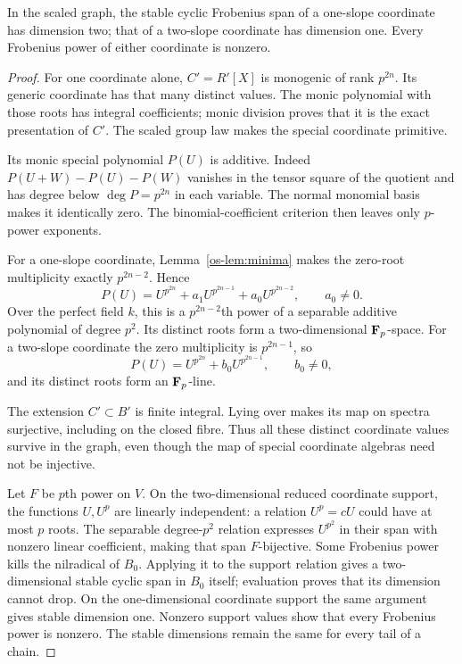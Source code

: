 \begin{lemma}\label{os-lem:stable-spans}
In the scaled graph, the stable cyclic Frobenius span of a one-slope coordinate has dimension two; that of a two-slope coordinate has dimension one. Every Frobenius power of either coordinate is nonzero.
\end{lemma}
\begin{proof}
For one coordinate alone, $C'=R'[X]$ is monogenic of rank $p^{2n}$. Its generic coordinate has that many distinct values. The monic polynomial with those roots has integral coefficients; monic division proves that it is the exact presentation of $C'$. The scaled group law makes the special coordinate primitive.

Its monic special polynomial $P(U)$ is additive. Indeed $P(U+W)-P(U)-P(W)$ vanishes in the tensor square of the quotient and has degree below $\deg P=p^{2n}$ in each variable. The normal monomial basis makes it identically zero. The binomial-coefficient criterion then leaves only $p$-power exponents.

For a one-slope coordinate, Lemma~\ref{os-lem:minima} makes the zero-root multiplicity exactly $p^{2n-2}$. Hence
\[
 P(U)=U^{p^{2n}}+a_1U^{p^{2n-1}}+a_0U^{p^{2n-2}},
 \qquad a_0\ne0.
\]
Over the perfect field $k$, this is a $p^{2n-2}$th power of a separable additive polynomial of degree $p^2$. Its distinct roots form a two-dimensional $\mathbf F_p$-space. For a two-slope coordinate the zero multiplicity is $p^{2n-1}$, so
\[
 P(U)=U^{p^{2n}}+b_0U^{p^{2n-1}},\qquad b_0\ne0,
\]
and its distinct roots form an $\mathbf F_p$-line.

The extension $C'\subset B'$ is finite integral. Lying over makes its map on spectra surjective, including on the closed fibre. Thus all these distinct coordinate values survive in the graph, even though the map of special coordinate algebras need not be injective.

Let $F$ be $p$th power on $V$. On the two-dimensional reduced coordinate support, the functions $U,U^p$ are linearly independent: a relation $U^p=cU$ could have at most $p$ roots. The separable degree-$p^2$ relation expresses $U^{p^2}$ in their span with nonzero linear coefficient, making that span $F$-bijective. Some Frobenius power kills the nilradical of $B_0$. Applying it to the support relation gives a two-dimensional stable cyclic span in $B_0$ itself; evaluation proves that its dimension cannot drop. On the one-dimensional coordinate support the same argument gives stable dimension one. Nonzero support values show that every Frobenius power is nonzero. The stable dimensions remain the same for every tail of a chain.
\end{proof}


